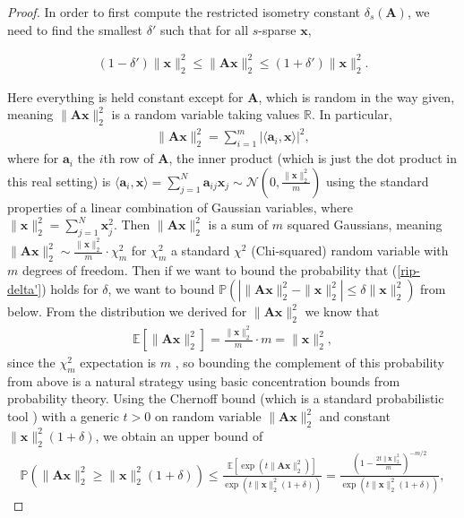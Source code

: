 \documentclass[12pt,a4paper]{amsart}
\numberwithin{equation}{section}
\theoremstyle{plain}
\theoremstyle{definition}
\newcommand{\BR}{\mathbb R}
\newcommand{\BE}{\mathbb E}
\newcommand{\BP}{\mathbb P}
\newcommand{\bdx}{\mathbf{x}}
\newcommand{\bda}{\mathbf{a}}
\newcommand{\bdA}{\mathbf{A}}
\begin{document}
\begin{proof}
    In order to first compute the restricted isometry constant $\delta_s(\bdA)$, we need to find the smallest $\delta'$ such that for all $s$-sparse $\bdx$, 
    
    \begin{align}\label{rip-delta'}
        (1-\delta')\|\bdx\|_2^2\leq\|\bdA\bdx\|_2^2\leq(1+\delta')\|\bdx\|_2^2.
    \end{align}
    
    Here everything is held constant except for $\bdA$, which is random in the way given, meaning $\|\bdA\bdx\|_2^2$ is a random variable taking values $\BR$. In particular, 
    \begin{align*}
        \|\bdA\bdx\|_2^2=\sum_{i=1}^m|\langle\bda_i,\bdx\rangle|^2,
    \end{align*}
    where for $\bda_i$ the $i$th row of $\bdA$, the inner product (which is just the dot product in this real setting) is $\langle\bda_i,\bdx\rangle=\sum_{j=1}^N\bda_{ij}\bdx_j\sim\mathcal{N}(0,\frac{\|\bdx\|_2^2}{m})$ using the standard properties of a linear combination of Gaussian variables, where $\|\bdx\|_2^2=\sum_{j=1}^N\bdx_j^2$. Then $\|\bdA\bdx\|_2^2$ is a sum of $m$ squared Gaussians, meaning $\|\bdA\bdx\|_2^2\sim\frac{\|\bdx\|_2^2}{m}\cdot\chi_m^2$ for $\chi_m^2$ a standard $\chi^2$ (Chi-squared) random variable with $m$ degrees of freedom. Then if we want to bound the probability that (\ref{rip-delta'}) holds for $\delta$, we want to bound $\BP(|\|\bdA\bdx\|_2^2-\|\bdx\|_2^2|\leq\delta\|\bdx\|_2^2)$ from below. From the distribution we derived for $\|\bdA\bdx\|_2^2$ we know that
    \begin{align*}
        \BE\left[\|\bdA\bdx\|_2^2\right]=\frac{\|\bdx\|_2^2}{m}\cdot m=\|\bdx\|_2^2,
    \end{align*}
    since the $\chi_m^2$ expectation is $m$ \cite{park-lee}, so bounding the complement of this probability from above is a natural strategy using basic concentration bounds from probability theory. Using the Chernoff bound (which is a standard probabilistic tool \cite{park-lee}) with a generic $t>0$ on random variable $\|\bdA\bdx\|_2^2$ and constant $\|\bdx\|_2^2(1+\delta)$, we obtain an upper bound of 
    \begin{align*}
        \BP(\|\bdA\bdx\|_2^2\geq\|\bdx\|_2^2(1+\delta))\leq\frac{\BE\left[\exp(t\|\bdA\bdx\|_2^2)\right]}{\exp(t\|\bdx\|_2^2(1+\delta))}=\frac{\left(1-\frac{2t\|\bdx\|_2^2}{m}\right)^{-m/2}}{\exp(t\|\bdx\|_2^2(1+\delta))},
    \end{align*}

\end{proof}
\end{document}
